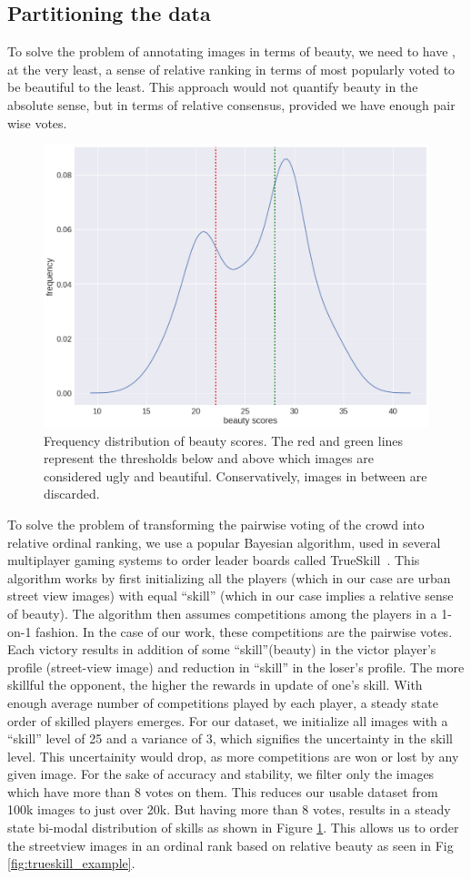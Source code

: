 \subsection{Partitioning the data}
To solve the problem of annotating images in terms of beauty, we need to have , at the very least, a sense of relative ranking in terms of most popularly voted to be beautiful to the least. This approach would not quantify beauty in the absolute sense, but in terms of relative consensus, provided we have enough pair wise votes. 
 
\begin{figure}[t!]
    \centering
    \includegraphics[width=0.7\columnwidth]{Trueskill.png}
    \caption{Frequency distribution of beauty scores. The red and green lines represent the thresholds below and above which images are considered ugly and beautiful. Conservatively, images in between are discarded.}
    \label{fig:Trueskill}
\end{figure}
To solve the problem of transforming the pairwise voting of the crowd into relative ordinal ranking, we use a popular Bayesian algorithm, used in several multiplayer gaming systems to order leader boards called TrueSkill~\cite{herbrich2007trueskill}. This algorithm works by first initializing all the players (which in our case are urban street view images) with equal ``skill'' (which in our case implies a relative sense of beauty).
The algorithm then assumes competitions among the players in a 1-on-1 fashion. In the case of our work, these competitions are the pairwise votes. Each victory results in addition of some ``skill''(beauty) in the victor player's profile (street-view image) and reduction in ``skill'' in the loser's profile. The more skillful the opponent, the higher the rewards in update of one's skill. With enough average number of competitions played by each player, a steady state order of skilled players emerges. For our dataset, we initialize all images with a ``skill'' level of 25 and a variance of 3, which signifies the uncertainty in the skill level. This uncertainity would drop, as more competitions are won or lost by any given image. For the sake of accuracy and stability, we filter only the images which have more than 8 votes on them. This reduces our usable dataset from 100k images to just over 20k. But having more than 8 votes, results in a steady state bi-modal distribution of skills as shown in Figure \ref{fig:Trueskill}. This allows us to order the streetview images in an ordinal rank based on relative beauty as seen in Fig \ref{fig:trueskill_example}. 

